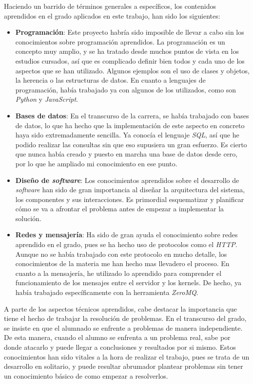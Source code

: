 \documentclass[11pt,spanish,listoffigures]{tfgetsinf}
\begin{document}
Haciendo un barrido de términos generales a específicos, los contenidos aprendidos en el grado aplicados en este trabajo, han sido los siguientes: 

\begin{itemize}

\item \textbf{Programación}: Este proyecto habría sido imposible de llevar a cabo sin los conocimientos sobre programación aprendidos. La programación es un concepto muy amplio, y se ha tratado desde muchos puntos de vista en los estudios cursados, así que es complicado definir bien todos y cada uno de los aspectos que se han utilizado. Algunos ejemplos son el uso de clases y objetos, la herencia o las estructuras de datos. En cuanto a lenguajes de programación, había trabajado ya con algunos de los utilizados, como son \textit{Python} y \textit{JavaScript}.

\item \textbf{Bases de datos}: En el transcurso de la carrera, se había trabajado con bases de datos, lo que ha hecho que la implementación de este aspecto en concreto haya sido extremadamente sencilla. Ya conocía el lenguaje \textit{SQL}, así que he podido realizar las consultas sin que eso supusiera un gran esfuerzo. Es cierto que nunca había creado y puesto en marcha una base de datos desde cero, por lo que he ampliado mi conocimiento en ese punto.

\item \textbf{Diseño de \textit{software}}: Los conocimientos aprendidos sobre el desarrollo de \textit{software} han sido de gran importancia al diseñar la arquitectura del sistema, los componentes y sus interacciones. Es primordial esquematizar y planificar cómo se va a afrontar el problema antes de empezar a implementar la solución.

\item \textbf{Redes y mensajería}: Ha sido de gran ayuda el conocimiento sobre redes aprendido en el grado, pues se ha hecho uso de protocolos como el \textit{HTTP}. Aunque no se había trabajado con este protocolo en mucho detalle, los conocimientos de la materia me han hecho mas llevadero el proceso. En cuanto a la mensajería, he utilizado lo aprendido para comprender el funcionamiento de los mensajes entre el servidor y los kernels. De hecho, ya había trabajado específicamente con la herramienta \textit{ZeroMQ}.

\end{itemize}

A parte de los aspectos técnicos aprendidos, cabe destacar la importancia que tiene el hecho de trabajar la resolución de problemas. En el transcurso del grado, se insiste en que el alumnado se enfrente a problemas de manera independiente. De esta manera, cuando el alumno se enfrenta a un problema real, sabe por donde atacarlo y puede llegar a conclusiones y resultados por si mismo. Estos conocimientos han sido vitales a la hora de realizar el trabajo, pues se trata de un desarrollo en solitario, y puede resultar abrumador plantear problemas sin tener un conocimiento básico de como empezar a resolverlos.
\end{document}
